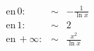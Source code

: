 \begin{eqnarray*}
\mathrm{en}\, 0 : &\sim& -\frac{1}{\ln x} \\
\mathrm{en}\, 1 : &\sim& 2\\
\mathrm{en}\, +\infty : &\sim& \frac{x^2}{\ln x}
\end{eqnarray*}